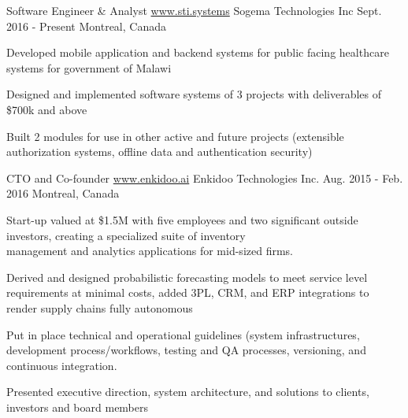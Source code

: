 

\begin{cventries}

  \cventry
    {Software Engineer \& Analyst \acvHeaderSocialSep \href{http://sti.systems}{www.sti.systems}} %
    {Sogema Technologies Inc} %
    {Sept. 2016 - Present} %
    {Montreal, Canada} %
    {
      \begin{cvitems} %
        \item {Developed mobile application and backend systems for public facing healthcare systems for government of Malawi}
        \item { Designed and implemented software systems of 3 projects with deliverables of \$700k and above }
        \item { Built 2 modules for use in other active and future projects (extensible authorization systems, offline data and authentication security) }
      \end{cvitems}
    }

  \cventry
    {CTO and Co-founder \acvHeaderSocialSep \href{http://www.enkidoo.ai}{www.enkidoo.ai} } %
    {Enkidoo Technologies Inc.} %
    {Aug. 2015 - Feb. 2016} %
    {Montreal, Canada} %
    {
      \begin{cvitems} %
      	\item{ Start-up valued at \$1.5M with five employees and two significant outside investors, creating a specialized suite of inventory \\ management and analytics applications for mid-sized firms. }
        \item{ Derived and designed probabilistic forecasting models to meet service level requirements at minimal costs, added 3PL, CRM, and ERP integrations to render supply chains fully autonomous }
        \item{ Put in place technical and operational guidelines (system infrastructures, development process/workflows, testing and QA processes, versioning,  and continuous integration. }
        \item{ Presented executive direction, system architecture, and solutions to clients, investors and board members }
      \end{cvitems}
    }


\end{cventries}
